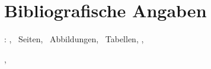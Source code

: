 
\chapter*{Bibliografische Angaben}
\label{sec:Referat}

\autor : \titel , \pageref{LastPage}~Seiten, \totalfigures ~Abbildungen, \totaltables ~Tabellen, \hochschule , \fachbereich

\arbeit , \the\year

\Satz
